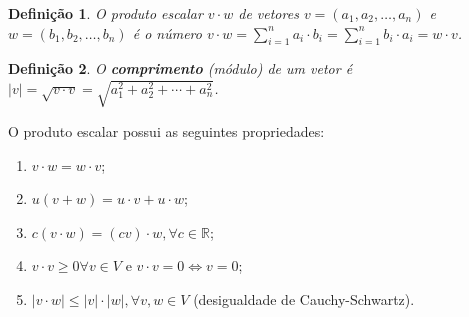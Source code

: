 \documentclass{article}
\newtheorem*{definition}{Definição}
\begin{document}
\begin{definition}
	O produto escalar $v\cdot w$ de vetores $v = (a_1, a_2, \dots, a_n)$ e $w = (b_1, b_2, \dots, b_n)$ é o número $\displaystyle{v\cdot w = \sum_{i=1}^{n}a_i\cdot b_i = \sum_{i=1}^{n}b_i\cdot a_i = w\cdot v}$. 
\end{definition}

\begin{definition}
	O \textbf{comprimento} (módulo) de um vetor é $|v| = \sqrt{v\cdot v} = \sqrt{a_1^2 + a_2^2 + \cdots + a_n^2}$.
\end{definition}

\par\vspace{0.3cm} O produto escalar possui as seguintes propriedades:
\begin{enumerate}
	\item $v\cdot w = w\cdot v$;
	\item $u(v + w) = u\cdot v + u\cdot w$;
	\item $c(v\cdot w) = (cv)\cdot w, \forall c\in\mathbb{R}$;
	\item $v\cdot v \geq0 \forall v\in V$ e $v\cdot v = 0\Leftrightarrow v = 0$;
	\item $|v\cdot w| \leq |v|\cdot|w|, \forall v,w\in V$ (desigualdade de Cauchy-Schwartz).
\end{enumerate}
\end{document}
